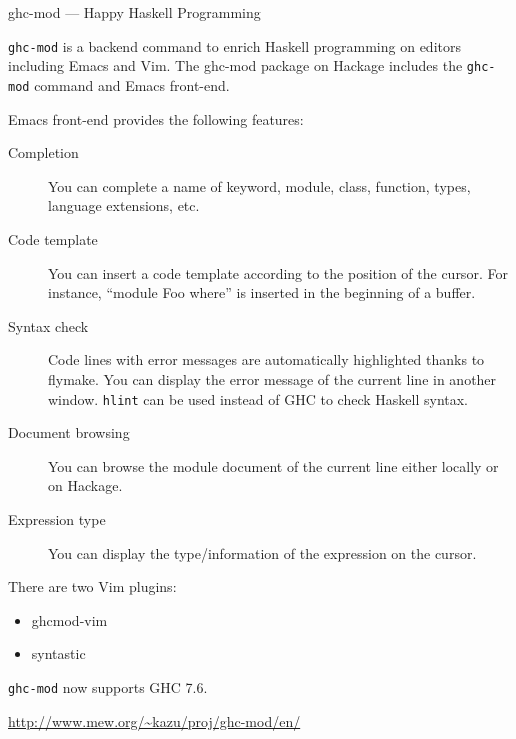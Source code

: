 \begin{hcarentry}[updated]{ghc-mod --- Happy Haskell Programming}
\makeheader

{\tt ghc-mod} is a backend command to enrich Haskell programming on editors including Emacs and Vim. The ghc-mod package on Hackage includes the {\tt ghc-mod} command and Emacs front-end. 

Emacs front-end provides the following features:

\begin{description}
\item[Completion] You can complete a name of keyword, module, class, function, types, language extensions, etc.

\item[Code template] You can insert a code template according to the position of the cursor. For instance, ``module Foo where'' is inserted in the beginning of a buffer.

\item[Syntax check] Code lines with error messages are automatically highlighted thanks to flymake. You can display the error message of the current line in another window. {\tt hlint} %
can be used instead of GHC to check Haskell syntax. 

\item[Document browsing] You can browse the module document of the current line either locally or on Hackage.

\item[Expression type] You can display the type/information of the expression on the cursor. 
\end{description}

There are two Vim plugins:

\begin{itemize}
\item ghcmod-vim
\item syntastic
\end{itemize}

{\tt ghc-mod} now supports GHC 7.6.

\FurtherReading
  \url{http://www.mew.org/~kazu/proj/ghc-mod/en/}
\end{hcarentry}
